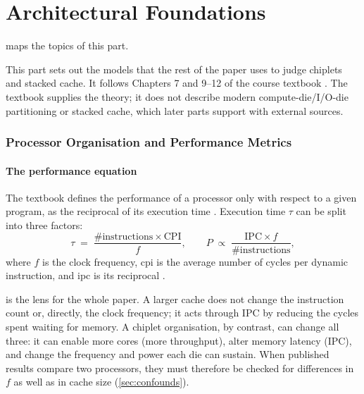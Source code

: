 \clearpage
\part{Architectural Foundations}
\label{part:foundations}
 maps the topics of this part.



This part sets out the models that the rest of the paper uses to judge chiplets and stacked cache. It follows Chapters 7 and 9--12 of the course textbook \cite{sarangi2025basic}. The textbook supplies the theory; it does not describe modern compute-die/I/O-die partitioning or stacked cache, which later parts support with external sources.

\section{Processor Organisation and Performance Metrics}
\label{sec:perf-metrics}

\subsection{The performance equation}

The textbook defines the performance of a processor only with respect to a given program, as the reciprocal of its execution time \cite[sec.~10.9.1]{sarangi2025basic}. Execution time $\tau$ can be split into three factors:
\begin{equation}
  \tau \;=\; \frac{\#\text{instructions} \times \mathrm{CPI}}{f},
  \qquad
  P \;\propto\; \frac{\mathrm{IPC} \times f}{\#\text{instructions}},
  \label{eq:perf}
\end{equation}
where $f$ is the clock frequency, \gls{cpi} is the average number of cycles per dynamic instruction, and \gls{ipc} is its reciprocal \cite[sec.~10.9.1]{sarangi2025basic}.

 is the lens for the whole paper. A larger cache does not change the instruction count or, directly, the clock frequency; it acts through IPC by reducing the cycles spent waiting for memory. A chiplet organisation, by contrast, can change all three: it can enable more cores (more throughput), alter memory latency (IPC), and change the frequency and power each die can sustain. When published results compare two processors, they must therefore be checked for differences in $f$ as well as in cache size (\cref{sec:confounds}).

